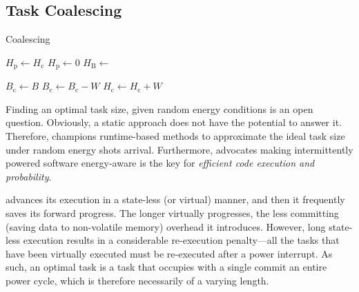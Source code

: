 \subsection{Task Coalescing}

\begin{algorithm}
	\caption{Coalescing}
	\label{algo:genCoalescing}
	\scriptsize
	\begin{algorithmic}[1]
        \State $H_\text{p} \gets H_\text{c}$
        \State $H_\text{p} \gets 0$ 
        \State $H_\text{B} \leftarrow $ 

	        \State $ B_\text{c} \gets B$
		        \State {}
		        \State $B_\text{c} \gets B_\text{c} - W$
				\State $H_\text{c} \gets H_\text{c} + W$
	        \EndWhile
	        \State {}
        \EndWhile
	\end{algorithmic}
\end{algorithm}

Finding an optimal task size, given random energy conditions is an open question. Obviously, a static approach does not have the potential to answer it. Therefore, \sys champions runtime-based methods to approximate the ideal task size under random energy shots arrival. Furthermore, \sys advocates making intermittently powered software energy-aware is the key for \emph{efficient code execution and probability}. 

\sys advances its execution in a state-less (or virtual) manner, and then it frequently saves its forward progress. The longer \sys virtually progresses, the less committing (saving data to non-volatile memory) overhead it introduces. However, long state-less execution results in a considerable re-execution penalty---all the tasks that have been virtually executed must be re-executed after a power interrupt. As such, an optimal task is a task that occupies with a single commit an entire power cycle, which is therefore necessarily of a varying length.  

